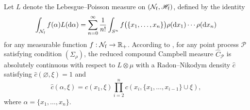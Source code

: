 \documentclass[12pt]{article}
\newcommand{\R}{\mathbb{R}}
\newcounter{con}%
\numberwithin{equation}{section}
\begin{document}
Let $L$ denote the Lebesgue--Poisson measure on $(\mathcal{N}_{\rm f},\mathscr{H}_{\rm f})$, defined by the identity
\begin{equation}\label{eq:LP-measure}
\int_{\mathcal{N}_{\rm f}}f(\alpha)L(\mathrm{d}\alpha)=
\sum_{n=0}^{\infty}\frac{1}{n!}\int_{S^n}f\bigl(\{x_1,\ldots,x_n\}\bigr)\rho(\mathrm{d}x_1)\cdots\rho(\mathrm{d}x_n)
\end{equation}
for any measurable function $f:\mathcal{N}_{\rm f}\to\R_+$.
According to \cite[Remark~2.5]{GY05}, for any point process $\mathcal{P}$ satisfying condition $(\Sigma_\rho)$, the reduced compound Campbell measure $\widehat{C}_{\mathcal{P}}$ is absolutely continuous with respect to $L\otimes \mu$ with a Radon--Nikodym density $\widehat{c}$ satisfying $\widehat{c}(\varnothing,\xi)=1$ and 
\begin{equation}\label{eq:compound-papangelou}
	\widehat{c}(\alpha,\xi)=c(x_1,\xi)\prod_{i=2}^nc(x_i,\{x_1,\ldots,x_{i-1}\}\cup\xi),
\end{equation}
where $\alpha=\{x_1,\ldots,x_n\}$.
\end{document}
